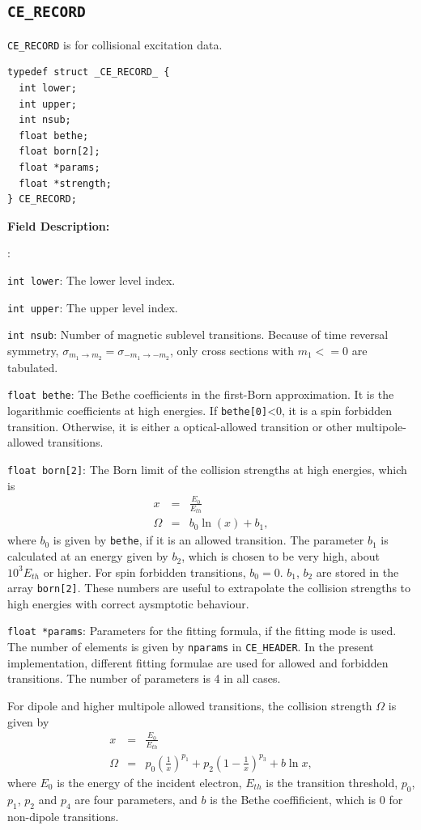 \documentclass[twoside,letterpaper]{refrep}
\newenvironment{dbdesc}{\textbf{Field Description:} \begin{list}
	{:}{\setlength{\labelwidth}{2in}
	   \setlength{\leftmargin}{2in}
	   \setlength{\labelsep}{0.1in}
	   \setlength{\rightmargin}{0.2in}}}
	{\end{list}}
\begin{document}
\subsection{\texttt{CE\_RECORD}}
\texttt{CE\_RECORD} is for collisional excitation data.

\begin{verbatim}
typedef struct _CE_RECORD_ {
  int lower;
  int upper;
  int nsub;
  float bethe;
  float born[2];
  float *params;
  float *strength;
} CE_RECORD;
\end{verbatim}

\begin{dbdesc}
\item[\texttt{int lower}:] The lower level index.
\item[\texttt{int upper}:] The upper level index.
\item[\texttt{int nsub}:] Number of magnetic sublevel transitions. Because of
time reversal symmetry, $\sigma_{m_1\to m_2}=\sigma_{-m_1\to -m_2}$, only cross
sections with $m_1 <= 0$ are tabulated.
\item[\texttt{float bethe}:] The Bethe coefficients in the first-Born
approximation. It is the logarithmic coefficients at high energies. If
\texttt{bethe[0]}<0, it is a spin forbidden transition. Otherwise, it is
either a optical-allowed transition or other multipole-allowed transitions.
\item[\texttt{float born[2]}:] The Born limit of the collision strengths at
high energies, which is
\begin{eqnarray}
x &=& \frac{E_0}{E_{th}} \nonumber\\
\Omega &=& b_0\ln(x) + b_1,
\end{eqnarray}
where $b_0$ is given by \texttt{bethe}, if it is an allowed transition. The
parameter $b_1$ is calculated at an energy given by $b_2$, which is chosen to
be very high, about $10^{3}E_{th}$ or higher.
For spin forbidden transitions, $b_0 = 0$. $b_1$, $b_2$ are stored in the array
\texttt{born[2]}. These numbers are useful to extrapolate the collision
strengths to high energies with correct aysmptotic behaviour.
\item[\texttt{float *params}:] Parameters for the fitting formula, if the
fitting mode is used. The number of elements is given by \texttt{nparams} in
\texttt{CE\_HEADER}. In the present implementation, different fitting formulae
are used for allowed and forbidden transitions. The number of parameters is 4
in all cases. 

For dipole and higher multipole allowed transitions, the
collision strength $\Omega$ is given by
\begin{eqnarray}
x &=& \frac{E_0}{E_{th}} \nonumber\\
\Omega &=& p_0\left(\frac{1}{x}\right)^{p_1} + 
p_2\left(1-\frac{1}{x}\right)^{p_3} + b\ln x,
\end{eqnarray}
where $E_0$ is the energy of the incident electron, $E_{th}$ is the transition
threshold, $p_0$, $p_1$, $p_2$ and $p_4$ are four parameters, and $b$ is the
Bethe coeffificient, which is 0 for non-dipole transitions.


\end{dbdesc}
\end{document}
